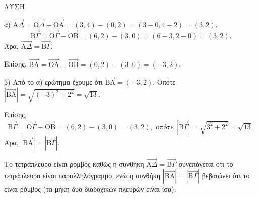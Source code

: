 ΛΥΣΗ

α) $\overrightarrow{\text{A}\Delta} = \overrightarrow{\text{O}\Delta} - \overrightarrow{\text{O}\text{A}} = (3,4) - (0,2) = (3-0, 4-2) = (3,2)$.
\[
\overrightarrow{\text{B}\Gamma} = \overrightarrow{\text{O}\Gamma} - \overrightarrow{\text{O}\text{B}} = (6,2) - (3,0) = (6-3, 2-0) = (3,2).
\]
Άρα, $\overrightarrow{\text{A}\Delta} = \overrightarrow{\text{B}\Gamma}$.

Επίσης, $\overrightarrow{\text{B}\text{A}} = \overrightarrow{\text{O}\text{A}} - \overrightarrow{\text{O}\text{B}} = (0,2) - (3,0) = (-3,2)$.

β) Από το α) ερώτημα έχουμε ότι $\overrightarrow{\text{B}\text{A}} = (-3,2)$. Οπότε $|\overrightarrow{\text{B}\text{A}}| = \sqrt{(-3)^2 + 2^2} = \sqrt{13}$.

Επίσης,
\[
\overrightarrow{\text{B}\Gamma} = \overrightarrow{\text{O}\Gamma} - \overrightarrow{\text{O}\text{B}} = (6,2) - (3,0) = (3,2), \text{ οπότε } |\overrightarrow{\text{B}\Gamma}| = \sqrt{3^2 + 2^2} = \sqrt{13}.
\]
Άρα, $|\overrightarrow{\text{B}\text{A}}| = |\overrightarrow{\text{B}\Gamma}|$.

Το τετράπλευρο  είναι ρόμβος καθώς η συνθήκη $\overrightarrow{\text{A}\Delta} = \overrightarrow{\text{B}\Gamma}$ συνεπάγεται ότι το τετράπλευρο  είναι παραλληλόγραμμο, ενώ η συνθήκη $|\overrightarrow{\text{B}\text{A}}| = |\overrightarrow{\text{B}\Gamma}|$ βεβαιώνει ότι το  είναι ρόμβος (τα μήκη δύο διαδοχικών πλευρών είναι ίσα).

